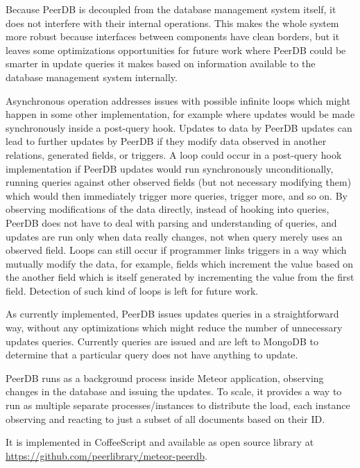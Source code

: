 Because PeerDB is decoupled from the database management system itself, it does not interfere with their internal operations.
This makes the whole system more robust because interfaces between components have clean borders, but it leaves some optimizations opportunities for future work where PeerDB could be smarter in update queries it makes based on information available to the database management system internally.

Asynchronous operation addresses issues with possible infinite loops which might happen in some other implementation, for example where updates would be made synchronously inside a post-query hook.
Updates to data by PeerDB updates can lead to further updates by PeerDB if they modify data observed in another relations, generated fields, or triggers.
A loop could occur in a post-query hook implementation if PeerDB updates would run synchronously unconditionally, running queries against other observed fields (but not necessary modifying them) which would then immediately trigger more queries, trigger more, and so on.
By observing modifications of the data directly, instead of hooking into queries, PeerDB does not have to deal with parsing and understanding of queries, and updates are run only when data really changes, not when query merely uses an observed field.
Loops can still occur if programmer links triggers in a way which mutually modify the data, for example, fields which increment the value based on the another field which is itself generated by incrementing the value from the first field.
Detection of such kind of loops is left for future work.

As currently implemented, PeerDB issues updates queries in a straightforward way, without any optimizations which might reduce the number of unnecessary updates queries.
Currently queries are issued and are left to MongoDB to determine that a particular query does not have anything to update.

PeerDB runs as a background process inside Meteor application, observing changes in the database and issuing the updates.
To scale, it provides a way to run as multiple separate processes/instances to distribute the load, each instance observing and reacting to just a subset of all documents based on their ID.

It is implemented in CoffeeScript and available as open source library at \url{https://github.com/peerlibrary/meteor-peerdb}.